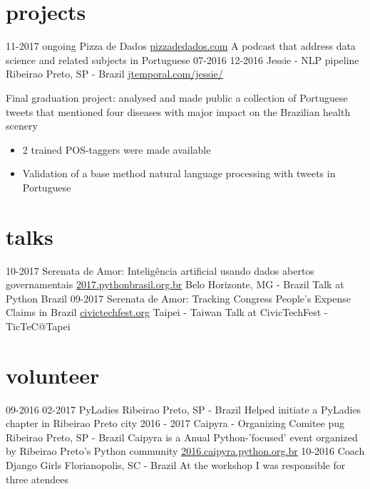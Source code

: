 \documentclass[]{friggeri-cv}
\begin{document}
\section{projects}

\begin{entrylist}
  \entry
    {11-2017 ongoing}
    {Pizza de Dados}
    {\href{http://pizzadedados.com/}{pizzadedados.com}}
    {A podcast that address data science and related subjects in Portuguese}
  \entrysecondtype
    {07-2016 12-2016}
    {Jessie - NLP pipeline}
    {Ribeirao Preto, SP - Brazil}
    {\href{http://jtemporal.com/jessie/}{jtemporal.com/jessie/}}
    {Final graduation project: analysed and made public a collection of Portuguese tweets that mentioned four diseases with major impact on the Brazilian health scenery
      \begin{itemize}
        \item 2 trained POS-taggers were made available
        \item Validation of a base method natural language processing with tweets in Portuguese
      \end{itemize}
    }
\end{entrylist}

\section{talks}

\begin{entrylist}
  \talkentry
    {10-2017}
    {Serenata de Amor: Inteligência artificial usando dados abertos governamentais}
    {\href{http://2017.pythonbrasil.org.br/}{2017.pythonbrasil.org.br}}
    {Belo Horizonte, MG - Brazil}
    {Talk at Python Brazil}
  \talkentry
    {09-2017}
    {Serenata de Amor: Tracking Congress People's Expense Claims in Brazil}
    {\href{http://civictechfest.org/}{civictechfest.org}}
    {Taipei - Taiwan}
    {Talk at CivicTechFest - TicTeC@Tapei}
\end{entrylist}

\section{volunteer}

\begin{entrylist}
  \entry
    {09-2016 02-2017}
    {PyLadies}
    {Ribeirao Preto, SP - Brazil}
    {Helped initiate a PyLadies chapter in Ribeirao Preto city}
  \entry
    {2016 - 2017}
    {Caipyra - Organizing Comitee}
    {pug Ribeirao Preto, SP - Brazil}
    {Caipyra is a Anual Python-'focused' event organized by Ribeirao Preto's Python community \footnotesize\href{2016.caipyra.python.org.br}{2016.caipyra.python.org.br}}
  \entry
    {10-2016}
    {Coach}
    {Django Girls Florianopolis, SC - Brazil}
    {At the workshop I was responsible for three atendees}
\end{entrylist}
\end{document}

